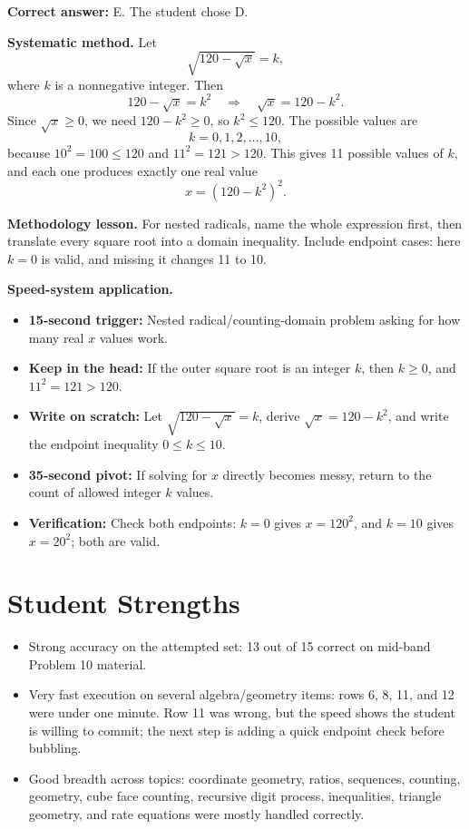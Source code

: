 \documentclass[11pt]{article}
\begin{document}
\textbf{Correct answer:} E. The student chose D.

\textbf{Systematic method.} Let
\[
\sqrt{120-\sqrt{x}}=k,
\]
where \(k\) is a nonnegative integer. Then
\[
120-\sqrt{x}=k^2
\quad\Rightarrow\quad
\sqrt{x}=120-k^2.
\]
Since \(\sqrt{x}\ge 0\), we need \(120-k^2\ge 0\), so \(k^2\le 120\). The possible values are
\[
k=0,1,2,\ldots,10,
\]
because \(10^2=100\le120\) and \(11^2=121>120\). This gives 11 possible values of \(k\), and each one produces exactly one real value
\[
x=(120-k^2)^2.
\]

\textbf{Methodology lesson.} For nested radicals, name the whole expression first, then translate every square root into a domain inequality. Include endpoint cases: here \(k=0\) is valid, and missing it changes 11 to 10.

\textbf{Speed-system application.}
\begin{itemize}
  \item \textbf{15-second trigger:} Nested radical/counting-domain problem asking for how many real \(x\) values work.
  \item \textbf{Keep in the head:} If the outer square root is an integer \(k\), then \(k\ge0\), and \(11^2=121>120\).
  \item \textbf{Write on scratch:} Let \(\sqrt{120-\sqrt{x}}=k\), derive \(\sqrt{x}=120-k^2\), and write the endpoint inequality \(0\le k\le10\).
  \item \textbf{35-second pivot:} If solving for \(x\) directly becomes messy, return to the count of allowed integer \(k\) values.
  \item \textbf{Verification:} Check both endpoints: \(k=0\) gives \(x=120^2\), and \(k=10\) gives \(x=20^2\); both are valid.
\end{itemize}

\section{Student Strengths}

\begin{itemize}
  \item Strong accuracy on the attempted set: 13 out of 15 correct on mid-band Problem 10 material.
  \item Very fast execution on several algebra/geometry items: rows 6, 8, 11, and 12 were under one minute. Row 11 was wrong, but the speed shows the student is willing to commit; the next step is adding a quick endpoint check before bubbling.
  \item Good breadth across topics: coordinate geometry, ratios, sequences, counting, geometry, cube face counting, recursive digit process, inequalities, triangle geometry, and rate equations were mostly handled correctly.
\end{itemize}
\end{document}
